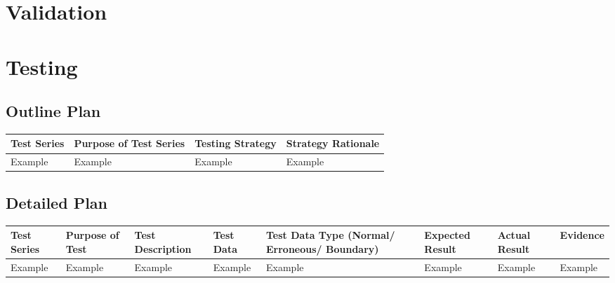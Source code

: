 \section{Validation}

\section{Testing}

\begin{landscape}
\subsection{Outline Plan}

\begin{center}
    \begin{tabular}{|p{2cm}|p{5cm}|p{5cm}|p{4cm}|}
        \hline
        \textbf{Test Series} & \textbf{Purpose of Test Series} & \textbf{Testing Strategy} & \textbf{Strategy Rationale}\\ \hline
        Example & Example & Example & Example \\ \hline
    \end{tabular}
\end{center}

\subsection{Detailed Plan}

\begin{center}
    \begin{longtable}{|p{1.5cm}|p{2.5cm}|p{2.5cm}|p{2cm}|p{2cm}|p{2cm}|p{2cm}|p{2cm}|}
        \hline
        \textbf{Test Series} & \textbf{Purpose of Test} & \textbf{Test Description} & \textbf{Test Data} & \textbf{Test Data Type (Normal/ Erroneous/ Boundary)} & \textbf{Expected Result} & \textbf{Actual Result} & \textbf{Evidence}\\ \hline
        Example & Example & Example & Example & Example & Example & Example & Example \\ \hline
    \end{longtable}
\end{center}
\end{landscape}
